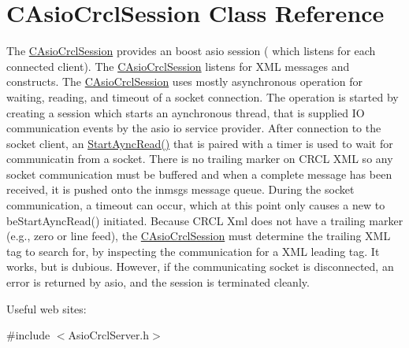 \hypertarget{classCAsioCrclSession}{\section{C\-Asio\-Crcl\-Session Class Reference}
\label{classCAsioCrclSession}
}


The \hyperlink{classCAsioCrclSession}{C\-Asio\-Crcl\-Session} provides an boost asio session ( which listens for each connected client). The \hyperlink{classCAsioCrclSession}{C\-Asio\-Crcl\-Session} listens for X\-M\-L messages and constructs. The \hyperlink{classCAsioCrclSession}{C\-Asio\-Crcl\-Session} uses mostly asynchronous operation for waiting, reading, and timeout of a socket connection. The operation is started by creating a session which starts an aynchronous thread, that is supplied I\-O communication events by the asio io service provider. After connection to the socket client, an \hyperlink{classCAsioCrclSession_ac7e0900916ab6de40bf546116d5e6d3e}{Start\-Aync\-Read()} that is paired with a timer is used to wait for communicatin from a socket. There is no trailing marker on C\-R\-C\-L X\-M\-L so any socket communication must be buffered and when a complete message has been received, it is pushed onto the inmsgs message queue. During the socket communication, a timeout can occur, which at this point only causes a new to be\-Start\-Aync\-Read() initiated. Because C\-R\-C\-L Xml does not have a trailing marker (e.\-g., zero or line feed), the \hyperlink{classCAsioCrclSession}{C\-Asio\-Crcl\-Session} must determine the trailing X\-M\-L tag to search for, by inspecting the communication for a X\-M\-L leading tag. It works, but is dubious. However, if the communicating socket is disconnected, an error is returned by asio, and the session is terminated cleanly. \par
 Useful web sites\-:  




{\ttfamily \#include $<$Asio\-Crcl\-Server.\-h$>$}

